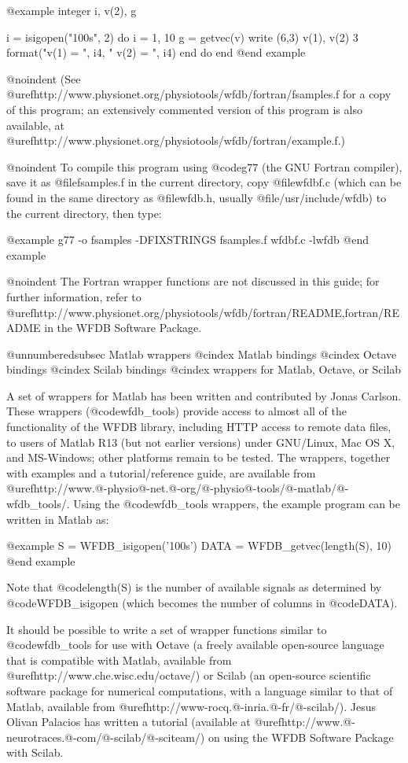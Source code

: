 {{@example
        integer i, v(2), g

        i = isigopen("100s", 2)
        do i = 1, 10
         g = getvec(v)
         write (6,3) v(1), v(2)
 3      format("v(1) = ", i4, "    v(2) = ", i4)
        end do
        end
@end example

@noindent
(See @uref{http://www.physionet.org/physiotools/wfdb/fortran/fsamples.f}
for a copy of this program;  an extensively commented version of this program
is also available, at
@uref{http://www.physionet.org/physiotools/wfdb/fortran/example.f}.)

@noindent
To compile this program using @code{g77} (the GNU Fortran compiler), save it as
@file{fsamples.f} in the current directory, copy @file{wfdbf.c} (which can be
found in the same directory as @file{wfdb.h}, usually @file{/usr/include/wfdb})
to the current directory, then type:

@example
g77 -o fsamples -DFIXSTRINGS fsamples.f wfdbf.c -lwfdb
@end example

@noindent
The Fortran wrapper functions are not discussed in this guide; for further
information, refer to
@uref{http://www.physionet.org/physiotools/wfdb/fortran/README,fortran/README}
in the WFDB Software Package.

@unnumberedsubsec Matlab wrappers
@cindex Matlab bindings
@cindex Octave bindings
@cindex Scilab bindings
@cindex wrappers for Matlab, Octave, or Scilab

A set of wrappers for Matlab has been written and contributed by Jonas Carlson.
These wrappers (@code{wfdb_tools}) provide access to almost all of the
functionality of the WFDB library, including HTTP access to remote data files,
to users of Matlab R13 (but not earlier versions) under GNU/Linux, Mac OS X,
and MS-Windows; other platforms remain to be tested.  The wrappers, together
with examples and a tutorial/reference guide, are available from
@uref{http://www.@-physio@-net.@-org/@-physio@-tools/@-matlab/@-wfdb_tools/}.
Using the @code{wfdb_tools} wrappers, the example program can be written in
Matlab as:

@example
        S = WFDB_isigopen('100s')
        DATA = WFDB_getvec(length(S), 10)
@end example

Note that @code{length(S)} is the number of available signals as determined
by @code{WFDB_isigopen} (which becomes the number of columns in @code{DATA}).

It should be possible to write a set of wrapper functions similar to
@code{wfdb_tools} for use with Octave (a freely available open-source
language that is compatible with Matlab, available from
@uref{http://www.che.wisc.edu/octave/}) or Scilab (an open-source
scientific software package for numerical computations, with a language
similar to that of Matlab, available from
@uref{http://www-rocq.@-inria.@-fr/@-scilab/}).
Jesus Olivan Palacios has written a tutorial (available at
@uref{http://www.@-neurotraces.@-com/@-scilab/@-sciteam/}) on using the WFDB
Software Package with Scilab.

}}

